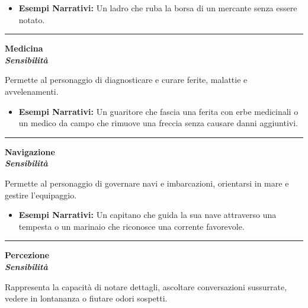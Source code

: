 \documentclass[../manuale_main.tex]{subfiles}
\begin{document}
\begin{itemize}
\item \textbf{Esempi Narrativi:} Un ladro che ruba la borsa di un mercante senza essere notato.
\end{itemize}

\vspace{0.5cm}\rule{\textwidth}{0.4pt}\vspace{0.5cm}

\begin{center}
\textbf{\large{Medicina}}\\ \textit{\textbf{Sensibilità}}\\
\end{center}
Permette al personaggio di diagnosticare e curare ferite, malattie e avvelenamenti.

\begin{itemize}
\item \textbf{Esempi Narrativi:} Un guaritore che fascia una ferita con erbe medicinali o un medico da campo che rimuove una freccia senza causare danni aggiuntivi.
\end{itemize}

\vspace{0.5cm}\rule{\textwidth}{0.4pt}\vspace{0.5cm}

\begin{center}
\textbf{\large{Navigazione}}\\ \textit{\textbf{Sensibilità}}\\
\end{center}
Permette al personaggio di governare navi e imbarcazioni, orientarsi in mare e gestire l’equipaggio.

\begin{itemize}
\item \textbf{Esempi Narrativi:} Un capitano che guida la sua nave attraverso una tempesta o un marinaio che riconosce una corrente favorevole.
\end{itemize}

\vspace{0.5cm}\rule{\textwidth}{0.4pt}\vspace{0.5cm}

\begin{center}
\textbf{\large{Percezione}}\\ \textit{\textbf{Sensibilità}}\\
\end{center}
Rappresenta la capacità di notare dettagli, ascoltare conversazioni sussurrate, vedere in lontananza o fiutare odori sospetti.
\end{document}
